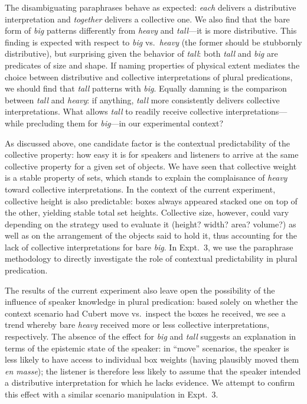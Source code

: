 \documentclass[linguex]{sp}
\begin{document}
The disambiguating paraphrases behave as expected: \emph{each} delivers a distributive interpretation and \emph{together} delivers a collective one. We also find that the bare form of \emph{big} patterns differently from \emph{heavy} and \emph{tall}---it is more distributive. This finding is expected with respect to \textit{big} vs.~\textit{heavy} (the former should be stubbornly distributive), but surprising given the behavior of \textit{tall}: both \emph{tall} and \emph{big} are predicates of size and shape. If naming properties of physical extent mediates the choice between distributive and collective interpretations of plural predications, we should find that \emph{tall} patterns with \emph{big}. Equally damning is the comparison between \emph{tall} and \emph{heavy}: if anything, \emph{tall} more consistently delivers collective interpretations. What allows \emph{tall} to readily receive collective interpretations---while precluding them for \emph{big}---in our experimental context? 

As discussed above, one candidate factor is the contextual predictability of the collective property: how easy it is for speakers and listeners to arrive at the same collective property for a given set of objects. We have seen that collective weight is a stable property of sets, which stands to explain the complaisance of \emph{heavy} toward collective interpretations. In the context of the current experiment, collective height is also predictable: boxes  always appeared stacked one on top of the other, yielding stable total set heights. Collective size, however, could vary depending on the strategy used to evaluate it (height? width? area? volume?) as well as on the arrangement of the objects said to hold it, thus accounting for the lack of collective interpretations for bare \emph{big}. In Expt.~3, we use the paraphrase methodology to directly investigate the role of contextual predictability in plural predication.

The results of the current experiment also leave open the possibility of the influence of speaker knowledge in plural predication: based solely on whether the context scenario had Cubert move vs.~inspect the boxes he received, we see a trend whereby bare \emph{heavy} received more or less collective interpretations, respectively. The absence of the effect for \emph{big} and \emph{tall} suggests an explanation in terms of the epistemic state of the speaker: in ``move'' scenarios, the speaker is less likely to have access to individual box weights (having plausibly moved them \emph{en masse}); the listener is therefore less likely to assume that the speaker intended a distributive interpretation for which he lacks evidence. We attempt to confirm this effect with a similar scenario manipulation in Expt.~3.
\end{document}
